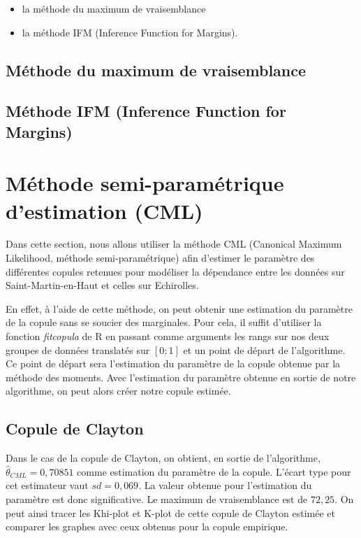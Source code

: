 \begin{itemize}
\item la méthode du maximum de vraisemblance
\item la méthode IFM (Inference Function for Margins).
\end{itemize}

\subsection{Méthode du maximum de vraisemblance}

\subsection{Méthode IFM (Inference Function for Margins)}


\section{Méthode semi-paramétrique d'estimation (CML)}

Dans cette section, nous allons utiliser la méthode CML (Canonical Maximum Likelihood, méthode semi-paramétrique) afin d'estimer le paramètre des différentes copules retenues pour modéliser la dépendance entre les données sur Saint-Martin-en-Haut et celles sur Echirolles.

En effet, à l'aide de cette méthode, on peut obtenir une estimation du paramètre de la copule sans se soucier des marginales. Pour cela, il suffit d'utiliser la fonction \textit{fitcopula} de R en passant comme arguments les rangs sur nos deux groupes de données translatés sur $[0;1]$ et un point de départ de l'algorithme. Ce point de départ sera l'estimation du paramètre de la copule obtenue par la méthode des moments. Avec l'estimation du paramètre obtenue en sortie de notre algorithme, on peut alors créer notre copule estimée.

\subsection{Copule de Clayton}

Dans le cas de la copule de Clayton, on obtient, en sortie de l'algorithme, $\widehat{\theta}_{CML}=0,70851$ comme estimation du paramètre de la copule. L'écart type pour cet estimateur vaut $sd = 0,069$. La valeur obtenue pour l'estimation du paramètre est donc significative. Le maximum de vraisemblance est de $72,25$. 
On peut ainsi tracer les Khi-plot et K-plot de cette copule de Clayton estimée et comparer les graphes avec ceux obtenus pour la copule empirique.

